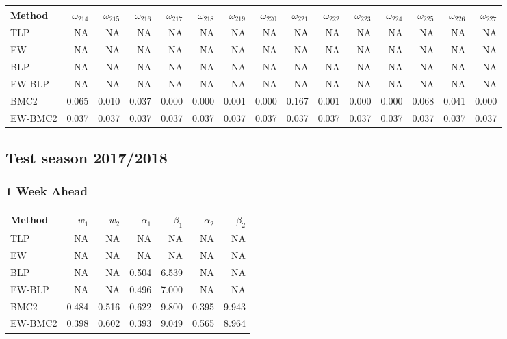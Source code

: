 \documentclass[
]{article}
\begin{document}
\begin{tabular}{lrrrrrrrrrrrrrr}
\toprule
Method & $\omega_{214}$ & $\omega_{215}$ & $\omega_{216}$ & $\omega_{217}$ & $\omega_{218}$ & $\omega_{219}$ & $\omega_{220}$ & $\omega_{221}$ & $\omega_{222}$ & $\omega_{223}$ & $\omega_{224}$ & $\omega_{225}$ & $\omega_{226}$ & $\omega_{227}$\\
\midrule
TLP & NA & NA & NA & NA & NA & NA & NA & NA & NA & NA & NA & NA & NA & NA\\
EW & NA & NA & NA & NA & NA & NA & NA & NA & NA & NA & NA & NA & NA & NA\\
BLP & NA & NA & NA & NA & NA & NA & NA & NA & NA & NA & NA & NA & NA & NA\\
EW-BLP & NA & NA & NA & NA & NA & NA & NA & NA & NA & NA & NA & NA & NA & NA\\
BMC2 & 0.065 & 0.010 & 0.037 & 0.000 & 0.000 & 0.001 & 0.000 & 0.167 & 0.001 & 0.000 & 0.000 & 0.068 & 0.041 & 0.000\\
EW-BMC2 & 0.037 & 0.037 & 0.037 & 0.037 & 0.037 & 0.037 & 0.037 & 0.037 & 0.037 & 0.037 & 0.037 & 0.037 & 0.037 & 0.037\\
\bottomrule
\end{tabular}

\newpage

\hypertarget{test-season-20172018-1}{%
\subsection{Test season 2017/2018}\label{test-season-20172018-1}}

\hypertarget{week-ahead-16}{%
\subsubsection{1 Week Ahead}\label{week-ahead-16}}

\begin{tabular}{lrrrrrr}
\toprule
Method & $w_1$ & $w_2$ & $\alpha_1$ & $\beta_1$ & $\alpha_2$ & $\beta_2$\\
\midrule
TLP & NA & NA & NA & NA & NA & NA\\
EW & NA & NA & NA & NA & NA & NA\\
BLP & NA & NA & 0.504 & 6.539 & NA & NA\\
EW-BLP & NA & NA & 0.496 & 7.000 & NA & NA\\
BMC2 & 0.484 & 0.516 & 0.622 & 9.800 & 0.395 & 9.943\\
EW-BMC2 & 0.398 & 0.602 & 0.393 & 9.049 & 0.565 & 8.964\\
\bottomrule
\end{tabular}
\end{document}
